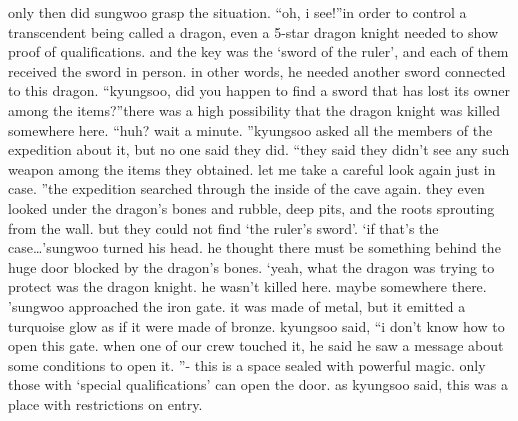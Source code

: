 only then did sungwoo grasp the situation.
“oh, i see!”in order to control a transcendent being called a dragon, even a 5-star dragon knight needed to show proof of qualifications.
 and the key was the ‘sword of the ruler’, and each of them received the sword in person.
in other words, he needed another sword connected to this dragon.
“kyungsoo, did you happen to find a sword that has lost its owner among the items?”there was a high possibility that the dragon knight was killed somewhere here.
“huh? wait a minute.
”kyungsoo asked all the members of the expedition about it, but no one said they did.
“they said they didn’t see any such weapon among the items they obtained.
 let me take a careful look again just in case.
”the expedition searched through the inside of the cave again.
 they even looked under the dragon’s bones and rubble, deep pits, and the roots sprouting from the wall.
 but they could not find ‘the ruler’s sword’.
‘if that’s the case…’sungwoo turned his head.
 he thought there must be something behind the huge door blocked by the dragon’s bones.
‘yeah, what the dragon was trying to protect was the dragon knight.
 he wasn’t killed here.
 maybe somewhere there.
’sungwoo approached the iron gate.
 it was made of metal, but it emitted a turquoise glow as if it were made of bronze.
kyungsoo said, “i don’t know how to open this gate.
 when one of our crew touched it, he said he saw a message about some conditions to open it.
”- this is a space sealed with powerful magic.
 only those with ‘special qualifications’ can open the door.
as kyungsoo said, this was a place with restrictions on entry.

